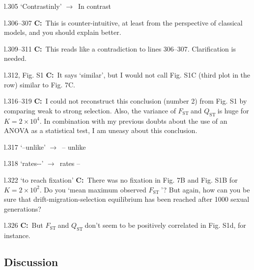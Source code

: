 \documentclass[11pt]{article}
\newenvironment{my_description}
{\begin{description}
  \setlength{\itemsep}{2pt}
  \setlength{\parskip}{0pt}
  \setlength{\parsep}{0pt}}
{\end{description}}
\newcommand{\ra}{$\rightarrow$\ }
\newcommand{\C}{\textbf{C:}\ }
\newcommand{\fst}{$F_{\mathrm{ST}}\ $}
\newcommand{\qst}{$Q_{\mathrm{ST}}\ $}
\begin{document}
\begin{my_description}
	\item[l.305] `Contrastinly' \ra In contrast
	\item[l.306--307] \C This is counter-intuitive, at least from the perspective of classical models, and you should explain better.
	\item[l.309--311] \C This reads like a contradiction to lines 306--307. Clarification is needed.
	\item[l.312, Fig. S1] \C It says `similar', but I would not call Fig. S1C (third plot in the row) similar to Fig. 7C.
	\item[l.316--319] \C I could not reconstruct this conclusion (number 2) from Fig. S1 by comparing weak to strong selection. Also, the variance of \fst and \qst is huge for $K = 2\times 10^4$. In combination with my previous doubts about the use of an ANOVA as a statistical test, I am uneasy about this conclusion.
	\item[l.317] `--unlike' \ra -- unlike
	\item[l.318] `rates{-}{-}' \ra rates --
	\item[l.322] `to reach fixation' \C There was no fixation in Fig. 7B and Fig. S1B for $K=2\times10^2$. Do you `mean maximum observed \fst'? But again, how can you be sure that drift-migration-selection equilibrium has been reached after 1000 sexual generations?
	\item[l.326] \C But \fst and \qst don't seem to be positively correlated in Fig. S1d, for instance.
\end{my_description}

\subsection{Discussion}
\end{document}
